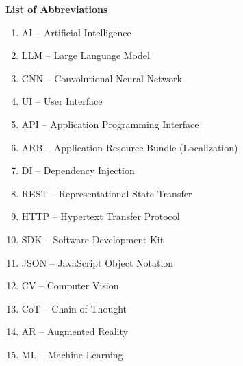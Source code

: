 \documentclass[12pt]{article}
\begin{document}
\thispagestyle{fancy}
\begin{center}
    \textbf{\LARGE List of Abbreviations}
\end{center}

\vspace{1cm}

\begin{enumerate}
    \item AI  -- Artificial Intelligence
    \item LLM -- Large Language Model
    \item CNN -- Convolutional Neural Network
    \item UI  -- User Interface
    \item API -- Application Programming Interface
    \item ARB -- Application Resource Bundle (Localization)
    \item DI  -- Dependency Injection
    \item REST -- Representational State Transfer
    \item HTTP -- Hypertext Transfer Protocol
    \item SDK  -- Software Development Kit
    \item JSON -- JavaScript Object Notation
    \item CV   -- Computer Vision
    \item CoT  -- Chain-of-Thought
    \item AR   -- Augmented Reality
    \item ML   -- Machine Learning
\end{enumerate}
\end{document}
